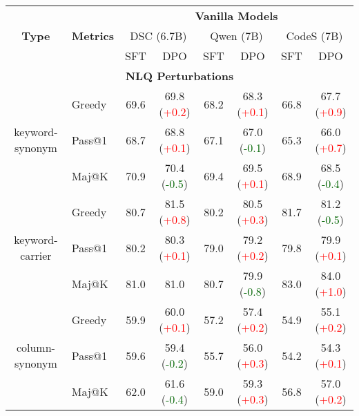 \begin{table*}[t!]
    \centering
\begin{adjustbox}{max width=\textwidth}
    \begin{tabular}{c | l | c c | c c | c c }
        \toprule
         \multirow{3}{*}{\textbf{Type}} & \multirow{3}{*}{\textbf{Metrics}} & \multicolumn{6}{c}{\textbf{Vanilla Models}} \\ \cline{3-8}
         & & \multicolumn{2}{c}{DSC (6.7B)} & \multicolumn{2}{c}{Qwen (7B)} & \multicolumn{2}{c}{CodeS (7B)} \\ \cline{3-8}
         & & SFT & DPO & SFT & DPO & SFT & DPO \\ \midrule
        \multicolumn{8}{c}{\textbf{NLQ Perturbations}} \\ \midrule

        \multirow{3}{*}{keyword-synonym} & Greedy & 69.6 & 69.8 (\textcolor{red}{+0.2}) & 68.2 & 68.3 (\textcolor{red}{+0.1}) & 66.8 & 67.7 (\textcolor{red}{+0.9}) \\
        & Pass@1 & 68.7 & 68.8 (\textcolor{red}{+0.1}) & 67.1 & 67.0 (\textcolor{darkgreen}{-0.1}) & 65.3 & 66.0 (\textcolor{red}{+0.7}) \\
        & Maj@K & 70.9 & 70.4 (\textcolor{darkgreen}{-0.5}) & 69.4 & 69.5 (\textcolor{red}{+0.1}) & 68.9 & 68.5 (\textcolor{darkgreen}{-0.4}) \\
        \midrule

        \multirow{3}{*}{keyword-carrier} & Greedy & 80.7 & 81.5 (\textcolor{red}{+0.8}) & 80.2 & 80.5 (\textcolor{red}{+0.3}) & 81.7 & 81.2 (\textcolor{darkgreen}{-0.5}) \\
& Pass@1 & 80.2 & 80.3 (\textcolor{red}{+0.1}) & 79.0 & 79.2 (\textcolor{red}{+0.2}) & 79.8 & 79.9 (\textcolor{red}{+0.1}) \\
& Maj@K & 81.0 & 81.0 \phantom{(+0.3)} & 80.7 & 79.9 (\textcolor{darkgreen}{-0.8}) & 83.0 & 84.0 (\textcolor{red}{+1.0}) \\ \midrule

        \multirow{3}{*}{column-synonym} & Greedy & 59.9 & 60.0 (\textcolor{red}{+0.1}) & 57.2 & 57.4 (\textcolor{red}{+0.2}) & 54.9 & 55.1 (\textcolor{red}{+0.2}) \\
& Pass@1 & 59.6 & 59.4 (\textcolor{darkgreen}{-0.2}) & 55.7 & 56.0 (\textcolor{red}{+0.3}) & 54.2 & 54.3 (\textcolor{red}{+0.1}) \\
& Maj@K & 62.0 & 61.6 (\textcolor{darkgreen}{-0.4}) & 59.0 & 59.3 (\textcolor{red}{+0.3}) & 56.8 & 57.0 (\textcolor{red}{+0.2}) \\ \midrule


\end{tabular}
\end{adjustbox}
\end{table*}
